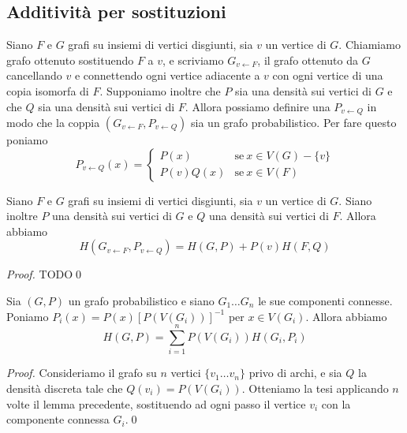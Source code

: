 \subsection{Additività per sostituzioni}
Siano \(F\) e \(G\) grafi su insiemi di vertici disgiunti, sia \(v\) un vertice di \(G\). Chiamiamo grafo ottenuto sostituendo \(F\) a \(v\), e scriviamo \(G_{v\leftarrow F}\), il grafo ottenuto da \(G\) cancellando \(v\) e connettendo ogni vertice adiacente a \(v\) con ogni vertice di una copia isomorfa di \(F\). Supponiamo inoltre che \(P\) sia una densità sui vertici di \(G\) e che \(Q\) sia una densità sui vertici di \(F\). Allora possiamo definire una \(P_{v\leftarrow Q}\) in modo che la coppia \((G_{v\leftarrow F}, P_{v\leftarrow Q})\) sia un grafo probabilistico. Per fare questo poniamo
\[P_{v\leftarrow Q}(x)= 
\begin{cases}
	P(x) & \text{se}\ x\in V(G)-\{v\}\\
	P(v)Q(x) & \text{se}\ x\in V(F) 
\end{cases}
\]
\begin{lemma}
	Siano \(F\) e \(G\) grafi su insiemi di vertici disgiunti, sia \(v\) un vertice di \(G\). Siano inoltre \(P\) una densità sui vertici di \(G\) e \(Q\) una densità sui vertici di \(F\). Allora abbiamo
	\[H(G_{v\leftarrow F}, P_{v\leftarrow Q})=H(G,P)+P(v)H(F,Q)\]
\end{lemma}
\begin{proof}
	TODO\qed 
\end{proof}
\begin{corollary}
	Sia \((G,P)\) un grafo probabilistico e siano \(G_{1}\dots G_{n}\) le sue componenti connesse. Poniamo \(P_i(x)=P(x)[P(V(G_i))]^{-1}\) per \(x\in V(G_i)\). Allora abbiamo
	\[H(G,P)=\sum_{i=1}^n P(V(G_i))H(G_i,P_i)\]
\end{corollary}
\begin{proof}
	Consideriamo il grafo su \(n\) vertici \(\{v_{1}\dots v_{n}\}\) privo di archi, e sia \(Q\) la densità discreta tale che \(Q(v_{i}) = P(V(G_i))\). Otteniamo la tesi applicando \(n\) volte il lemma precedente, sostituendo ad ogni passo il vertice \(v_i\) con la componente connessa \(G_{i}\).\qed 
\end{proof}

